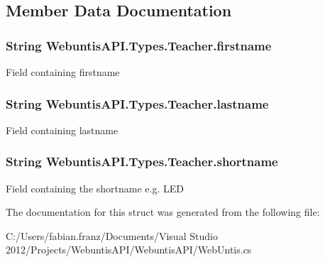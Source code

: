 \subsection{Member Data Documentation}
\hypertarget{struct_webuntis_a_p_i_1_1_types_1_1_teacher_a60aa3278d7509fea3a5fd3e9d7e12e91}{
\subsubsection[{firstname}]{\setlength{\rightskip}{0pt plus 5cm}String Webuntis\-A\-P\-I.\-Types.\-Teacher.\-firstname}}\label{struct_webuntis_a_p_i_1_1_types_1_1_teacher_a60aa3278d7509fea3a5fd3e9d7e12e91}
Field containing firstname \hypertarget{struct_webuntis_a_p_i_1_1_types_1_1_teacher_add1e2bb30e82e7ff0b14b3d497c44fcc}{
\subsubsection[{lastname}]{\setlength{\rightskip}{0pt plus 5cm}String Webuntis\-A\-P\-I.\-Types.\-Teacher.\-lastname}}\label{struct_webuntis_a_p_i_1_1_types_1_1_teacher_add1e2bb30e82e7ff0b14b3d497c44fcc}
Field containing lastname \hypertarget{struct_webuntis_a_p_i_1_1_types_1_1_teacher_ad4fe004e4ae11294e487a92947f3ff41}{
\subsubsection[{shortname}]{\setlength{\rightskip}{0pt plus 5cm}String Webuntis\-A\-P\-I.\-Types.\-Teacher.\-shortname}}\label{struct_webuntis_a_p_i_1_1_types_1_1_teacher_ad4fe004e4ae11294e487a92947f3ff41}
Field containing the shortname e.\-g. L\-E\-D 

The documentation for this struct was generated from the following file\-:\begin{DoxyCompactItemize}
\item 
C\-:/\-Users/fabian.\-franz/\-Documents/\-Visual Studio 2012/\-Projects/\-Webuntis\-A\-P\-I/\-Webuntis\-A\-P\-I/Web\-Untis.\-cs\end{DoxyCompactItemize}
